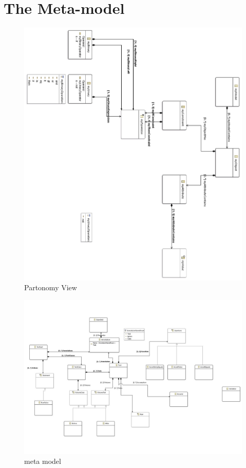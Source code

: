 \documentclass[paper=a4, fontsize=11pt]{scrartcl} %
\numberwithin{equation}{section} %
\numberwithin{figure}{section} %
\numberwithin{table}{section} %
\begin{document}
\section{The Meta-model}
\begin{figure}[ht!]
\centering
\includegraphics[scale=0.7]{pictures/partView.png}
\caption{Partonomy View}
\end{figure}

\begin{figure}[ht!]
\centering
\includegraphics[scale=0.7]{pictures/mrha.pdf}
\caption{meta model}
\end{figure}
\end{document}

